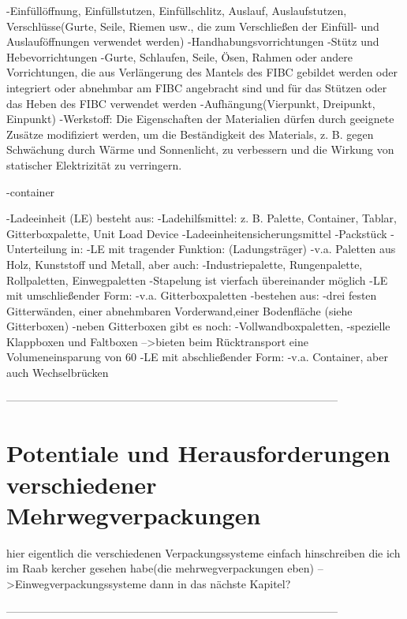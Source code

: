                     -Einfüllöffnung, Einfüllstutzen, Einfüllschlitz, Auslauf, Auslaufstutzen, Verschlüsse(Gurte, Seile, Riemen usw., die zum Verschließen der Einfüll- und Auslauföffnungen verwendet werden)
                -Handhabungsvorrichtungen
                    -Stütz und Hebevorrichtungen
                        -Gurte, Schlaufen, Seile, Ösen, Rahmen oder andere Vorrichtungen, die aus Verlängerung des Mantels des FIBC gebildet werden oder integriert oder abnehmbar am FIBC angebracht sind und für das Stützen oder das Heben des FIBC verwendet werden
                    -Aufhängung(Vierpunkt, Dreipunkt, Einpunkt)
            -Werkstoff:
                Die Eigenschaften der Materialien dürfen durch geeignete Zusätze modifiziert werden, um die Beständigkeit des Materials, z. B. gegen Schwächung durch Wärme und Sonnenlicht, zu verbessern und die Wirkung von statischer Elektrizität zu verringern.
            
        -container

-Ladeeinheit (LE)
    besteht aus: 
        -Ladehilfsmittel: z. B. Palette, Container, Tablar, Gitterboxpalette, Unit Load Device
        -Ladeeinheitensicherungsmittel
        -Packstück
    -Unterteilung in:
        -LE mit tragender Funktion: (Ladungsträger)
            -v.a. Paletten aus Holz, Kunststoff und Metall, aber auch:
                -Industriepalette, Rungenpalette, Rollpaletten, Einwegpaletten
            -Stapelung ist vierfach übereinander möglich
        -LE mit umschließender Form:
            -v.a. Gitterboxpaletten
                -bestehen aus:
                    -drei festen Gitterwänden, einer abnehmbaren Vorderwand,einer Bodenfläche (siehe Gitterboxen)
            -neben Gitterboxen gibt es noch:
                -Vollwandboxpaletten,
                -spezielle Klappboxen und Faltboxen
                    -->bieten beim Rücktransport eine Volumeneinsparung von 60 %
        -LE mit abschließender Form:
            -v.a. Container, aber auch  Wechselbrücken
    
       
------------------------------------------------------------------------------------------

\section{Potentiale und Herausforderungen verschiedener Mehrwegverpackungen}
\label{sec:Eignung von Verpackungen von Bauprodukten und Baustoffen:Potentiale und Herausforderungen verschiedener Mehrwegverpackungen}


hier eigentlich die verschiedenen Verpackungssysteme einfach hinschreiben die ich im Raab kercher gesehen habe(die mehrwegverpackungen eben)
    -->Einwegverpackungssysteme dann in das nächste Kapitel?

------------------------------------------------------------------------------------------
